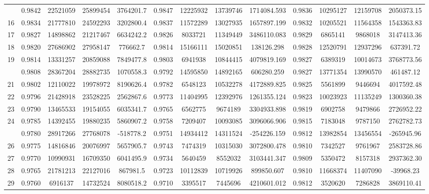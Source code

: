 \documentclass[
  12pt,
]{article}
\begin{document}
\begin{longtable}[t]{lcccccccccccc}
\addlinespace
15 & 0.9842 & 22521059 & 25899454 & 3764201.7 & 0.9847 & 12225932 & 13739746 & 1714084.593 & 0.9836 & 10295127 & 12159708 & 2050373.15\\
16 & 0.9834 & 21777810 & 24592293 & 3202800.4 & 0.9837 & 11572289 & 13027935 & 1657897.199 & 0.9832 & 10205521 & 11564358 & 1543363.83\\
17 & 0.9827 & 14898862 & 21217467 & 6634242.2 & 0.9826 & 8033721 & 11349449 & 3486110.083 & 0.9829 & 6865141 & 9868018 & 3147413.36\\
18 & 0.9820 & 27686902 & 27958147 & 776662.7 & 0.9814 & 15166111 & 15020851 & 138126.298 & 0.9828 & 12520791 & 12937296 & 637391.72\\
19 & 0.9814 & 13331257 & 20859088 & 7849477.8 & 0.9803 & 6941938 & 10844415 & 4079819.169 & 0.9827 & 6389319 & 10014673 & 3768773.56\\
\addlinespace
20 & 0.9808 & 28367204 & 28882735 & 1070558.3 & 0.9792 & 14595850 & 14892165 & 606280.259 & 0.9827 & 13771354 & 13990570 & 461487.12\\
21 & 0.9802 & 12110022 & 19978972 & 8190626.4 & 0.9782 & 6548123 & 10532278 & 4172889.825 & 0.9825 & 5561899 & 9446694 & 4017592.48\\
22 & 0.9796 & 21428918 & 23528225 & 2562867.6 & 0.9773 & 11404995 & 12392976 & 1261355.124 & 0.9823 & 10023923 & 11135249 & 1300360.38\\
23 & 0.9790 & 13465533 & 19154055 & 6035341.7 & 0.9765 & 6562775 & 9674189 & 3304933.898 & 0.9819 & 6902758 & 9479866 & 2726952.22\\
24 & 0.9785 & 14392455 & 19880235 & 5860907.2 & 0.9758 & 7209407 & 10093085 & 3096066.906 & 0.9815 & 7183048 & 9787150 & 2762782.73\\
\addlinespace
25 & 0.9780 & 28917266 & 27768078 & -518778.2 & 0.9751 & 14934412 & 14311524 & -254226.159 & 0.9812 & 13982854 & 13456554 & -265945.96\\
26 & 0.9775 & 14816846 & 20076997 & 5657905.7 & 0.9743 & 7474319 & 10315030 & 3072800.478 & 0.9810 & 7342527 & 9761967 & 2583728.86\\
27 & 0.9770 & 10990931 & 16709350 & 6041495.9 & 0.9734 & 5640459 & 8552032 & 3103441.347 & 0.9809 & 5350472 & 8157318 & 2937362.30\\
28 & 0.9765 & 21781213 & 22127016 & 867981.5 & 0.9723 & 10112839 & 10719926 & 899850.607 & 0.9810 & 11668374 & 11407090 & -39968.23\\
29 & 0.9760 & 6916137 & 14732524 & 8080518.2 & 0.9710 & 3395517 & 7445696 & 4210601.012 & 0.9812 & 3520620 & 7286828 & 3869110.41\\

\end{longtable}
\end{document}
